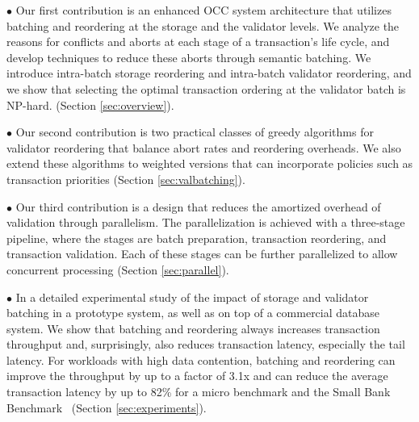 $\bullet$ Our first contribution is an enhanced OCC system architecture that utilizes batching and reordering at the storage and the validator levels. We analyze the reasons for conflicts and aborts at each stage of a transaction's life cycle, and develop techniques to reduce these aborts through semantic batching.
We introduce intra-batch storage reordering and
intra-batch validator reordering, and we show that selecting the
optimal transaction ordering at the validator batch is NP-hard.
(Section \ref{sec:overview}).

$\bullet$ Our second contribution is 
two practical classes of greedy algorithms for validator reordering 
that balance abort rates and reordering overheads.
We also extend these algorithms to weighted versions that can
incorporate policies such as transaction priorities (Section \ref{sec:valbatching}).

$\bullet$ Our third contribution is a design that reduces the amortized overhead of validation through parallelism. The parallelization is achieved with a three-stage pipeline, where the stages are batch preparation, transaction reordering, and transaction validation. Each of these stages can be further parallelized to allow concurrent processing (Section \ref{sec:parallel}).

$\bullet$ In a detailed experimental study of the impact of storage and validator batching in a prototype system, as well as on top of a commercial database system. We show that batching and reordering always increases transaction throughput and, surprisingly, also reduces transaction latency, especially the tail latency. For workloads with high data contention, batching and reordering can improve the throughput by up to a factor of 3.1x and can reduce the average transaction latency by up to 82\% for a micro benchmark and the Small Bank Benchmark~\cite{alomari2008icde} (Section \ref{sec:experiments}).

